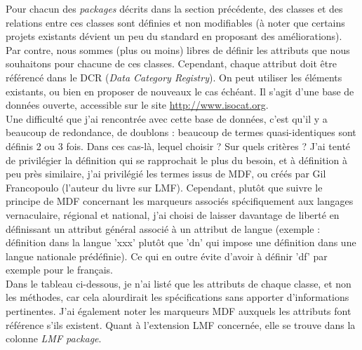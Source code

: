 \documentclass[a4paper,12pt]{article}
\begin{document}
Pour chacun des \textit{packages} d\'ecrits dans la section pr\'ec\'edente, des classes et des relations entre ces classes sont d\'efinies et non modifiables (\`a noter que certains projets existants d\'evient un peu du standard en proposant des am\'eliorations). Par contre, nous sommes (plus ou moins) libres de d\'efinir les attributs que nous souhaitons pour chacune de ces classes. Cependant, chaque attribut doit \^etre r\'ef\'erenc\'e dans le DCR (\textit{Data Category Registry}). On peut utiliser les \'el\'ements existants, ou bien en proposer de nouveaux le cas \'ech\'eant. Il s'agit d'une base de donn\'ees ouverte, accessible sur le site \url{http://www.isocat.org}.\\
Une difficult\'e que j'ai rencontr\'ee avec cette base de donn\'ees, c'est qu'il y a beaucoup de redondance, de doublons : beaucoup de termes quasi-identiques sont d\'efinis 2 ou 3 fois. Dans ces cas-l\`a, lequel choisir ? Sur quels crit\`eres ? J'ai tent\'e de privil\'egier la d\'efinition qui se rapprochait le plus du besoin, et \`a d\'efinition \`a peu pr\`es similaire, j'ai privil\'egi\'e les termes issus de MDF, ou cr\'e\'es par Gil Francopoulo (l'auteur du livre sur LMF). Cependant, plut\^ot que suivre le principe de MDF concernant les marqueurs associ\'es sp\'ecifiquement aux langages vernaculaire, r\'egional et national, j'ai choisi de laisser davantage de libert\'e en définissant un attribut g\'en\'eral associ\'e \`a un attribut de langue (exemple : d\'efinition dans la langue 'xxx' plut\^ot que 'dn' qui impose une d\'efinition dans une langue nationale pr\'ed\'efinie). Ce qui en outre \'evite d'avoir \`a d\'efinir 'df' par exemple pour le fran\c{c}ais.\\

Dans le tableau ci-dessous, je n'ai list\'e que les attributs de chaque classe, et non les m\'ethodes, car cela alourdirait les sp\'ecifications sans apporter d'informations pertinentes. J'ai \'egalement noter les marqueurs MDF auxquels les attributs font r\'ef\'erence s'ils existent. Quant \`a l'extension LMF concern\'ee, elle se trouve dans la colonne \textit{LMF package}.

\pagebreak
\end{document}
